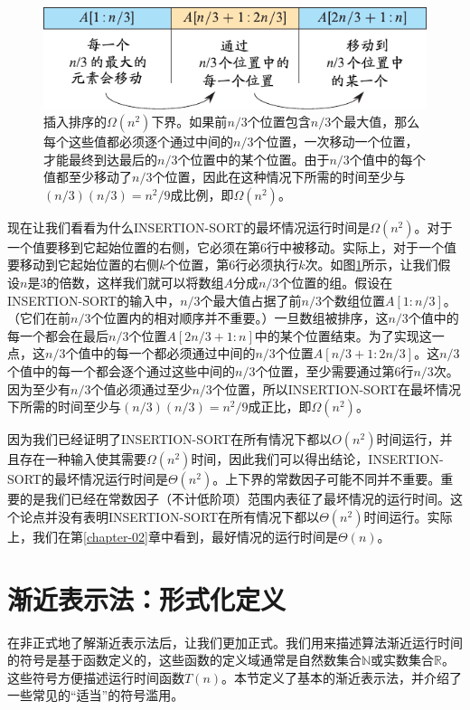 \documentclass[lang=cn,newtx,10pt,scheme=chinese]{elegantbook}
\begin{document}
\begin{figure}[htbp]
    \centering
    \includegraphics{算法导论第四版插图/第二章/插入排序的平均情况分析示意图.pdf}
    \caption{插入排序的$\Omega(n^2)$下界。如果前$n/3$个位置包含$n/3$个最大值，那么每个这些值都必须逐个通过中间的$n/3$个位置，一次移动一个位置，才能最终到达最后的$n/3$个位置中的某个位置。由于$n/3$个值中的每个值都至少移动了$n/3$个位置，因此在这种情况下所需的时间至少与$(n/3)(n/3)=n^2/9$成比例，即$\Omega(n^2)$。}
    \label{fig:插入排序的平均情况分析示意图}
\end{figure}

现在让我们看看为什么INSERTION-SORT的最坏情况运行时间是$\Omega(n^2)$。对于一个值要移到它起始位置的右侧，它必须在第6行中被移动。实际上，对于一个值要移动到它起始位置的右侧$k$个位置，第6行必须执行$k$次。如图\ref{fig:插入排序的平均情况分析示意图}所示，让我们假设$n$是3的倍数，这样我们就可以将数组$A$分成$n/3$个位置的组。假设在INSERTION-SORT的输入中，$n/3$个最大值占据了前$n/3$个数组位置$A[1:n/3]$。（它们在前$n/3$个位置内的相对顺序并不重要。）一旦数组被排序，这$n/3$个值中的每一个都会在最后$n/3$个位置$A[2n/3+1:n]$中的某个位置结束。为了实现这一点，这$n/3$个值中的每一个都必须通过中间的$n/3$个位置$A[n/3+1:2n/3]$。这$n/3$个值中的每一个都会逐个通过这些中间的$n/3$个位置，至少需要通过第6行$n/3$次。因为至少有$n/3$个值必须通过至少$n/3$个位置，所以INSERTION-SORT在最坏情况下所需的时间至少与$(n/3)(n/3)=n^2/9$成正比，即$\Omega(n^2)$。

因为我们已经证明了INSERTION-SORT在所有情况下都以$O(n^2)$时间运行，并且存在一种输入使其需要$\Omega(n^2)$时间，因此我们可以得出结论，INSERTION-SORT的最坏情况运行时间是$\Theta(n^2)$。上下界的常数因子可能不同并不重要。重要的是我们已经在常数因子（不计低阶项）范围内表征了最坏情况的运行时间。这个论点并没有表明INSERTION-SORT在所有情况下都以$\Theta(n^2)$时间运行。实际上，我们在第\ref{chapter-02}章中看到，最好情况的运行时间是$\Theta(n)$。

\section{渐近表示法：形式化定义}\label{section-3.2}

在非正式地了解渐近表示法后，让我们更加正式。我们用来描述算法渐近运行时间的符号是基于函数定义的，这些函数的定义域通常是自然数集合$\mathbb{N}$或实数集合$\mathbb{R}$。这些符号方便描述运行时间函数$T(n)$。本节定义了基本的渐近表示法，并介绍了一些常见的``适当''的符号滥用。
\end{document}
